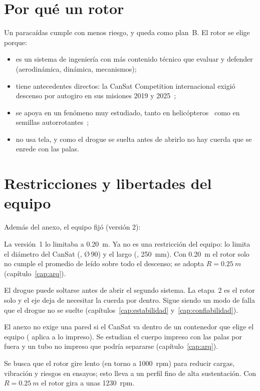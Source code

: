 \section{Por qué un rotor}
Un paracaídas cumple  con menos riesgo, y queda como plan~B. El rotor se elige
porque:
\begin{itemize}
  \item es un sistema de ingeniería con más contenido técnico que evaluar y defender
        (aerodinámica, dinámica, mecanismos);
  \item tiene antecedentes directos: la CanSat Competition internacional exigió descenso
        por autogiro en sus misiones 2019 y 2025~\cite{cansat2019,cansat2025};
  \item se apoya en un fenómeno muy estudiado, tanto en helicópteros~\cite{glauert1926,
        leishman2006,johnson1980} como en semillas autorrotantes~\cite{norberg1973,
        azuma1989,lentink2009};
  \item no usa tela, y como el drogue se suelta antes de abrirlo no hay cuerda que se
        enrede con las palas.
\end{itemize}

\section{Restricciones y libertades del equipo}
Además del anexo, el equipo fijó (versión 2):
\begin{description}[style=nextline]
  \item[Radio del rotor.] La versión~1 lo limitaba a \SI{0.20}{m}. Ya no es una restricción
        del equipo: lo limita el diámetro del CanSat (, Ø\,90) y el largo (,
        \SI{250}{mm}). Con \SI{0.20}{m} el rotor solo no cumple el promedio de  leído sobre
        todo el descenso; se adopta $R=\SI{0.25}{m}$ (capítulo~\ref{cap:arq}).
  \item[Drogue liberable.] El drogue puede soltarse antes de abrir el segundo sistema. La
        etapa~2 es el rotor solo y el eje deja de necesitar la cuerda por dentro. Sigue
        siendo un modo de falla que el drogue no se suelte (capítulos~\ref{cap:estabilidad}
        y~\ref{cap:confiabilidad}).
  \item[Contenedor propio.] El anexo no exige una pared si el CanSat va dentro de un
        contenedor que elige el equipo ( aplica a lo impreso). Se estudian el cuerpo
        impreso con las palas por fuera y un tubo no impreso que podría separarse
        (capítulo~\ref{cap:arq}).
  \item[Pocas rpm.] Se busca que el rotor gire lento (en torno a \SI{1000}{rpm}) para
        reducir cargas, vibración y riesgos en ensayos; esto lleva a un perfil fino de
        alta sustentación. Con $R=\SI{0.25}{m}$ el rotor gira a unas \SI{1230}{rpm}.
\end{description}

